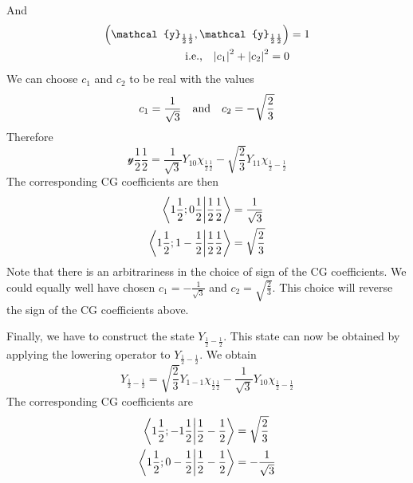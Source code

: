 And
\begin{align}
\qty(\mathcal{y}_{\frac{1}{2}\frac{1}{2}},\mathcal{y}_{\frac{1}{2}\frac{1}{2}}) &= 1 \nonumber\\
\label{chapter19.eqn6-spin-orbit}
\qq{i.e.,} \abs{c_1}^2 + \abs{c_2}^2 = 0
\end{align}
We can choose $c_1$ and $c_2$ to be real with the values
\begin{equation}
c_1 = \frac{1}{\sqrt{3}} \qq{and} c_2 = - \sqrt{\frac{2}{3}}
\end{equation}
Therefore
\begin{equation}
\label{chapter19.eqn7-spin-orbit}
\mathcal{y}{\frac{1}{2}\frac{1}{2}} = \frac{1}{\sqrt{3}} Y_{1 0}\chi_{\frac{1}{2}\frac{1}{2}} - \sqrt{\frac{2}{3}} Y_{11} \chi_{\frac{1}{2}-\frac{1}{2}}
\end{equation}
The corresponding CG coefficients are then
\begin{align*}
\braket{1\frac{1}{2};0\frac{1}{2}}{\frac{1}{2}\frac{1}{2}} &= \frac{1}{\sqrt{3}} \\
\braket{1 \frac{1}{2}; 1 -\frac{1}{2}}{\frac{1}{2} \frac{1}{2}} &= \sqrt{\frac{2}{3}}
\end{align*}
Note that there is an arbitrariness in the choice of sign of the CG coefficients. We could equally well have chosen $c_1 = - \frac{1}{\sqrt{3}}$ and $c_2 = \sqrt{\frac{2}{3}}$. This choice will reverse the sign of the CG coefficients above.

Finally, we have to construct the state $Y_{\frac{1}{2}-\frac{1}{2}}$. This state can now be obtained by applying the lowering operator to $Y_{\frac{1}{2}-\frac{1}{2}}$. We obtain
\begin{equation}
\label{chapter19.eqn8-spin-orbit}
Y_{\frac{1}{2}-\frac{1}{2}} = \sqrt{\frac{2}{3}} Y_{1 -1} \chi_{\frac{1}{2}\frac{1}{2}} - \frac{1}{\sqrt{3}} Y_{1 0} \chi_{\frac{1}{2}-\frac{1}{2}}
\end{equation}
The corresponding CG coefficients are 
\begin{align*}
\braket{1 \frac{1}{2}; -1 \frac{1}{2}}{\frac{1}{2}-\frac{1}{2}} &= \sqrt{\frac{2}{3}} \\
\braket{1 \frac{1}{2}; 0 -\frac{1}{2}}{\frac{1}{2} - \frac{1}{2}} &= - \frac{1}{\sqrt{3}}
\end{align*}

